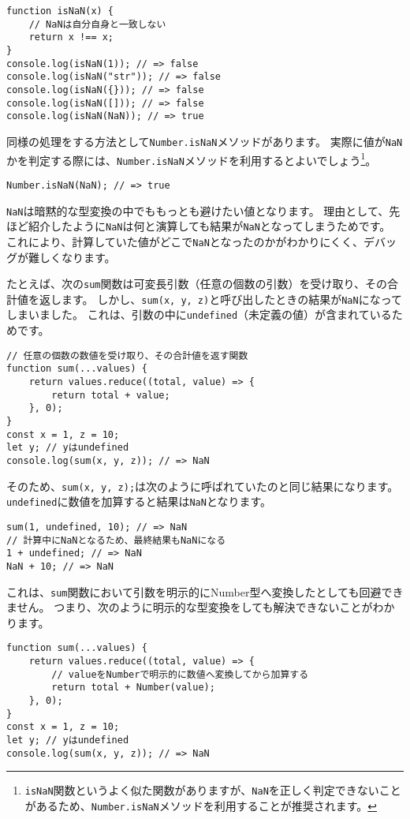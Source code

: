 \begin{lstlisting}
function isNaN(x) {
    // NaNは自分自身と一致しない
    return x !== x;
}
console.log(isNaN(1)); // => false
console.log(isNaN("str")); // => false
console.log(isNaN({})); // => false
console.log(isNaN([])); // => false
console.log(isNaN(NaN)); // => true
\end{lstlisting}

同様の処理をする方法として\texttt{Number.isNaN}メソッドがあります。
実際に値が\texttt{NaN}かを判定する際には、\texttt{Number.isNaN}メソッドを利用するとよいでしょう\footnote{\texttt{isNaN}関数というよく似た関数がありますが、\texttt{NaN}を正しく判定できないことがあるため、\texttt{Number.isNaN}メソッドを利用することが推奨されます。}。

\begin{lstlisting}
Number.isNaN(NaN); // => true
\end{lstlisting}

\texttt{NaN}は暗黙的な型変換の中でももっとも避けたい値となります。
理由として、先ほど紹介したように\texttt{NaN}は何と演算しても結果が\texttt{NaN}となってしまうためです。
これにより、計算していた値がどこで\texttt{NaN}となったのかがわかりにくく、デバッグが難しくなります。

たとえば、次の\texttt{sum}関数は可変長引数（任意の個数の引数）を受け取り、その合計値を返します。
しかし、\texttt{sum(x, y, z)}と呼び出したときの結果が\texttt{NaN}になってしまいました。
これは、引数の中に\texttt{undefined}（未定義の値）が含まれているためです。

\begin{lstlisting}
// 任意の個数の数値を受け取り、その合計値を返す関数
function sum(...values) {
    return values.reduce((total, value) => {
        return total + value;
    }, 0);
}
const x = 1, z = 10;
let y; // yはundefined
console.log(sum(x, y, z)); // => NaN
\end{lstlisting}

そのため、\texttt{sum(x, y, z);}は次のように呼ばれていたのと同じ結果になります。
\texttt{undefined}に数値を加算すると結果は\texttt{NaN}となります。

\begin{lstlisting}
sum(1, undefined, 10); // => NaN
// 計算中にNaNとなるため、最終結果もNaNになる
1 + undefined; // => NaN
NaN + 10; // => NaN
\end{lstlisting}

これは、\texttt{sum}関数において引数を明示的にNumber型へ変換したとしても回避できません。
つまり、次のように明示的な型変換をしても解決できないことがわかります。
\newpage
\begin{lstlisting}
function sum(...values) {
    return values.reduce((total, value) => {
        // valueをNumberで明示的に数値へ変換してから加算する
        return total + Number(value);
    }, 0);
}
const x = 1, z = 10;
let y; // yはundefined
console.log(sum(x, y, z)); // => NaN
\end{lstlisting}

